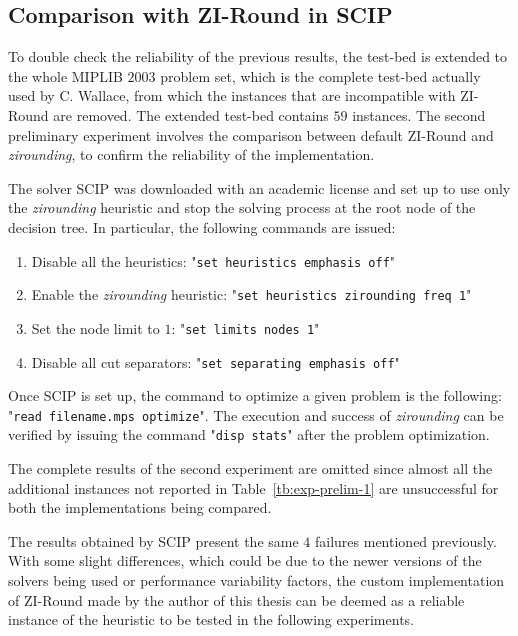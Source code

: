 \documentclass[a4paper,12pt,twoside]{scrbook}
\begin{document}
\subsection{Comparison with ZI-Round in SCIP}
To double check the reliability of the previous results, the test-bed is extended to the whole MIPLIB $2003$ problem set, which is the complete test-bed actually used by C. Wallace, from which the instances that are incompatible with ZI-Round are removed. The extended test-bed contains $59$ instances. The second preliminary experiment involves the comparison between default ZI-Round and \textit{zirounding}, to confirm the reliability of the implementation. \par 

The solver SCIP was downloaded with an academic license and set up to use only the \textit{zirounding} heuristic and stop the solving process at the root node of the decision tree. In particular, the following commands are issued:
\begin{enumerate}
	\item Disable all the heuristics: "\texttt{set heuristics emphasis off}"
	\item Enable the \textit{zirounding} heuristic: "\texttt{set heuristics zirounding freq 1}"
	\item Set the node limit to $1$: "\texttt{set limits nodes 1}"
	\item Disable all cut separators: "\texttt{set separating emphasis off}"
\end{enumerate}
Once SCIP is set up, the command to optimize a given problem is the following: "\texttt{read filename.mps optimize}". The execution and success of \textit{zirounding} can be verified by issuing the command "\texttt{disp stats}" after the problem optimization. \par

The complete results of the second experiment are omitted since almost all the additional instances not reported in Table~\ref{tb:exp-prelim-1} are unsuccessful for both the implementations being compared.  \par 

The results obtained by SCIP present the same $4$ failures mentioned previously. With some slight differences, which could be due to the newer versions of the solvers being used or performance variability factors, the custom implementation of ZI-Round made by the author of this thesis can be deemed as a reliable instance of the heuristic to be tested in the following experiments.
\end{document}
